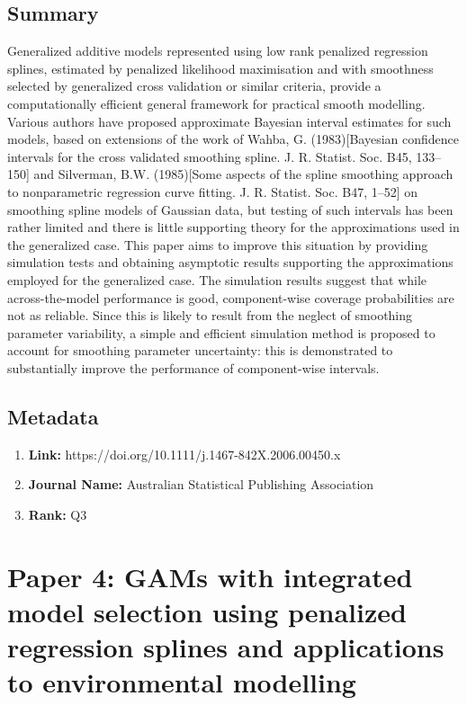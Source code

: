 \documentclass[10pt, oneside]{article}
\begin{document}
\subsection*{Summary}
Generalized additive models represented using low rank penalized regression splines, estimated by penalized likelihood
maximisation and with smoothness selected by generalized cross validation or similar criteria, provide a computationally
efficient general framework for practical smooth modelling. Various authors have proposed approximate Bayesian interval
estimates for such models, based on extensions of the work of Wahba, G. (1983)[Bayesian confidence intervals for the
		cross validated smoothing spline. J. R. Statist. Soc. B45, 133–150] and Silverman, B.W. (1985)[Some aspects of the spline
		smoothing approach to nonparametric regression curve fitting. J. R. Statist. Soc. B47, 1–52] on smoothing spline
models of Gaussian data, but testing of such intervals has been rather limited and there is little supporting
theory for the approximations used in the generalized case. This paper aims to improve this situation by providing
simulation tests and obtaining asymptotic results supporting the approximations employed for the generalized case.
The simulation results suggest that while across-the-model performance is good, component-wise coverage probabilities
are not as reliable. Since this is likely to result from the neglect of smoothing parameter variability, a simple and
efficient simulation method is proposed to account for smoothing parameter uncertainty: this is demonstrated to
substantially improve the performance of component-wise intervals. \cite{wood2006confidence}

\subsection*{Metadata}
\begin{enumerate}
	\item \textbf{Link:}  https://doi.org/10.1111/j.1467-842X.2006.00450.x
	\item \textbf{Journal Name:} Australian Statistical Publishing Association
	\item \textbf{Rank:} Q3
\end{enumerate}

\section*{Paper 4: GAMs with integrated model selection using penalized regression
  splines and applications to environmental modelling}
\end{document}
